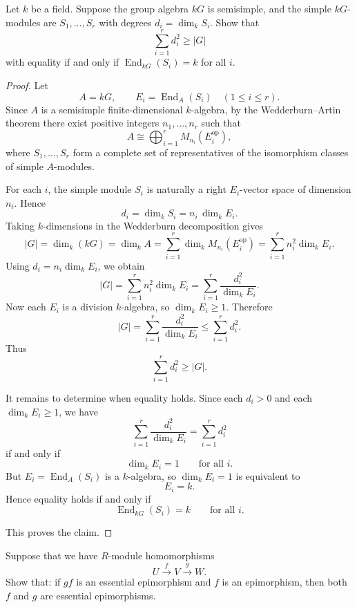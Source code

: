 \begin{exercise}
    Let $k$ be a field. Suppose the group algebra $kG$ is semisimple, and the simple $kG$-modules are $S_1,\dots,S_r$ with degrees $d_i=\dim_k S_i$. Show that
    \[
        \sum_{i=1}^r d_i^2 \ge |G|
    \]
    with equality if and only if $\operatorname{End}_{kG}(S_i)=k$ for all $i$.
\end{exercise}

\begin{proof}
    Let
    \[
        A=kG,
        \qquad
        E_i=\operatorname{End}_A(S_i)
        \quad (1\le i\le r).
    \]
    Since $A$ is a semisimple finite-dimensional $k$-algebra, by the Wedderburn--Artin theorem
    there exist positive integers $n_1,\dots,n_r$ such that
    \[
        A \cong \bigoplus_{i=1}^r M_{n_i}(E_i^{\operatorname{op}}),
    \]
    where $S_1,\dots,S_r$ form a complete set of representatives of the isomorphism classes
    of simple $A$-modules.

    For each $i$, the simple module $S_i$ is naturally a right $E_i$-vector space of
    dimension $n_i$. Hence
    \[
        d_i=\dim_k S_i = n_i\,\dim_k E_i.
    \]
    Taking $k$-dimensions in the Wedderburn decomposition gives
    \[
        |G|=\dim_k(kG)=\dim_k A
        =\sum_{i=1}^r \dim_k M_{n_i}(E_i^{\operatorname{op}})
        =\sum_{i=1}^r n_i^2 \dim_k E_i.
    \]
    Using $d_i=n_i\dim_k E_i$, we obtain
    \[
        |G|
        =\sum_{i=1}^r n_i^2\dim_k E_i
        =\sum_{i=1}^r \frac{d_i^2}{\dim_k E_i}.
    \]
    Now each $E_i$ is a division $k$-algebra, so $\dim_k E_i\ge 1$. Therefore
    \[
        |G|
        =\sum_{i=1}^r \frac{d_i^2}{\dim_k E_i}
        \le \sum_{i=1}^r d_i^2.
    \]
    Thus
    \[
        \sum_{i=1}^r d_i^2 \ge |G|.
    \]

    It remains to determine when equality holds. Since each $d_i>0$ and each
    $\dim_k E_i\ge 1$, we have
    \[
        \sum_{i=1}^r \frac{d_i^2}{\dim_k E_i}
        =
        \sum_{i=1}^r d_i^2
    \]
    if and only if
    \[
        \dim_k E_i=1
        \qquad\text{for all }i.
    \]
    But $E_i=\operatorname{End}_A(S_i)$ is a $k$-algebra, so $\dim_k E_i=1$ is equivalent to
    \[
        E_i=k.
    \]
    Hence equality holds if and only if
    \[
        \operatorname{End}_{kG}(S_i)=k
        \qquad\text{for all }i.
    \]

    This proves the claim.
\end{proof}

\begin{exercise}
    Suppose that we have $R$-module homomorphisms
    \[
        U \xrightarrow{f} V \xrightarrow{g} W.
    \]
    Show that: if $gf$ is an essential epimorphism and $f$ is an epimorphism, then both $f$ and $g$ are essential epimorphisms.
\end{exercise}

